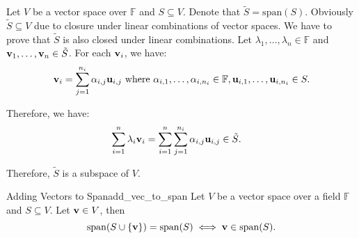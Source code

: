 \begin{proof*}
	Let $V$ be a vector space over $\mathbb{F}$ and $S\subseteq V$. Denote that $\tilde S = \mathrm{span}(S)$. Obviously $\tilde S \subseteq V$ due to closure under linear combinations of vector spaces. We have to prove that $\tilde S$ is also closed under linear combinations. Let $\lambda_1, \dots, \lambda_n\in\mathbb{F}$ and ${\bf v}_1, \dots, {\bf v}_n\in \tilde S$. For each ${\bf v}_i$, we have:
	\begin{align*}
		{\bf v}_i = \sum_{j=1}^{n_i} \alpha_{i, j} {\bf u}_{i,j} \text{ where } \alpha_{i,1}, \dots, \alpha_{i, n_i} \in \mathbb{F}, {\bf u}_{i,1}, \dots, {\bf u}_{i,n_i} \in S.
	\end{align*} 

	\noindent Therefore, we have:
	\begin{align*}
		\sum_{i=1}^n \lambda_i {\bf v}_i &= \sum_{i=1}^n \sum_{j=1}^{n_i} \alpha_{i, j}{\bf u}_{i, j} \in \tilde S.
	\end{align*} 

	\noindent Therefore, $\tilde S$ is a subspace of $V$.
\end{proof*}	 

\begin{proposition}{Adding Vectors to Span}{add_vec_to_span}
	Let $V$ be a vector space over a field $\mathbb{F}$ and $S\subseteq V$. Let ${\bf v}\in V$, then
	\begin{equation}
		\mathrm{span} (S\cup\{{\bf v}\}) = \mathrm{span} (S) \iff {\bf v} \in \mathrm{span} (S).
	\end{equation} 
\end{proposition} 

